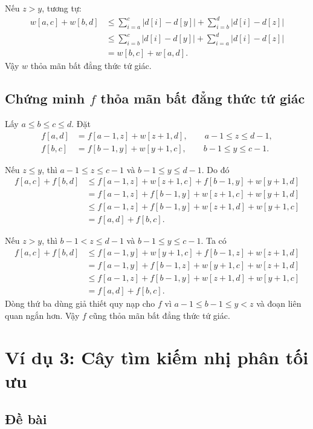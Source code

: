\documentclass[11pt]{article}
\begin{document}
Nếu $z>y$, tương tự:
\[
\begin{aligned}
  w[a,c]+w[b,d]
  &\le \sum_{i=a}^{c}|d[i]-d[y]|
       +\sum_{i=b}^{d}|d[i]-d[z]|\\
  &\le \sum_{i=b}^{c}|d[i]-d[y]|
       +\sum_{i=a}^{d}|d[i]-d[z]|\\
  &=w[b,c]+w[a,d].
\end{aligned}
\]
Vậy $w$ thỏa mãn bất đẳng thức tứ giác.

\subsection*{Chứng minh $f$ thỏa mãn bất đẳng thức tứ giác}

Lấy $a\le b\le c\le d$. Đặt
\[
\begin{aligned}
  f[a,d]&=f[a-1,z]+w[z+1,d],
       \qquad a-1\le z\le d-1,\\
  f[b,c]&=f[b-1,y]+w[y+1,c],
       \qquad b-1\le y\le c-1.
\end{aligned}
\]

Nếu $z\le y$, thì $a-1\le z\le c-1$ và $b-1\le y\le d-1$. Do đó
\[
\begin{aligned}
  f[a,c]+f[b,d]
  &\le f[a-1,z]+w[z+1,c]+f[b-1,y]+w[y+1,d]\\
  &= f[a-1,z]+f[b-1,y]+w[z+1,c]+w[y+1,d]\\
  &\le f[a-1,z]+f[b-1,y]+w[z+1,d]+w[y+1,c]\\
  &=f[a,d]+f[b,c].
\end{aligned}
\]

Nếu $z>y$, thì $b-1<z\le d-1$ và $b-1\le y\le c-1$. Ta có
\[
\begin{aligned}
  f[a,c]+f[b,d]
  &\le f[a-1,y]+w[y+1,c]+f[b-1,z]+w[z+1,d]\\
  &= f[a-1,y]+f[b-1,z]+w[y+1,c]+w[z+1,d]\\
  &\le f[a-1,z]+f[b-1,y]+w[z+1,d]+w[y+1,c]\\
  &=f[a,d]+f[b,c].
\end{aligned}
\]
Dòng thứ ba dùng giả thiết quy nạp cho $f$ vì
$a-1\le b-1\le y<z$ và đoạn liên quan ngắn hơn. Vậy $f$ cũng thỏa mãn bất
đẳng thức tứ giác.

\section{Ví dụ 3: Cây tìm kiếm nhị phân tối ưu}

\subsection*{Đề bài}
\end{document}
